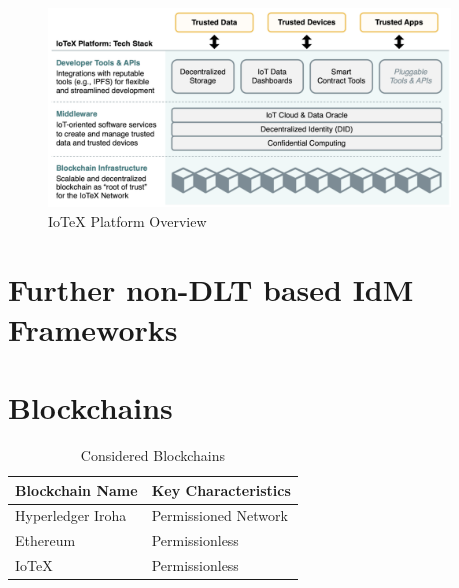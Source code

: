 \begin{figure}
	\begin{center}
		\includegraphics[width=0.95\textwidth]{figures/iotex-platform-stack.png}
	\end{center}
	\caption{IoTeX Platform Overview}
	\label{fig:iotex-platform-stack}
\end{figure}

\section{Further non-DLT based IdM Frameworks} %
\label{sec:Further non-DLT based IdM Frameworks}



\section{Blockchains} %
\label{sec:Blockchains}
\begin{table}
	\caption{Considered Blockchains}
	\label{tab:Considered Blockchains}
	\begin{center}
		\begin{tabular}[c]{|l|l|}
			\hline
			\textbf{Blockchain Name}                  & Key Characteristics  \\
			\hline
			Hyperledger Iroha \cite{hyperledger:wiki} & Permissioned Network \\
			\hline
			Ethereum                                  & Permissionless       \\
			\hline
			IoTeX \cite{iotex-bc-platform}            & Permissionless       \\
			\hline
		\end{tabular}
	\end{center}
\end{table}

